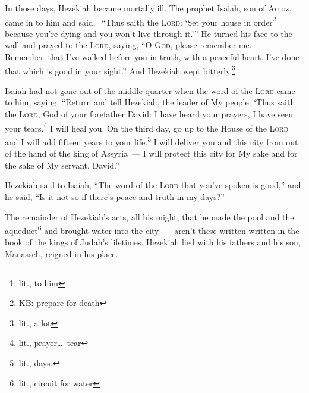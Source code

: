 
\begin{inparaenum}
     In those days, Hezekiah became mortally ill. The prophet Isaiah, son of Amoz, came in to him and said,\footnote{lit., to him} ``Thus saith the \textsc{Lord}: `Set your house in order\footnote{KB: prepare for death} because you're dying and you won't live through it.'\thinspace''%
     He turned his face to the wall and prayed to the \textsc{Lord}, saying,%
     ``O \textsc{God}, please remember me. Remember\understood\ that I've walked before you in truth, with a peaceful heart. I've done that which is good in your sight.'' And Hezekiah wept bitterly.\footnote{lit., a lot}%
    
     Isaiah had not gone out of the middle quarter when the word of the \textsc{Lord} came to him, saying,%
     ``Return and tell Hezekiah, the leader of My people: `Thus saith the \textsc{Lord}, God of your forefather David: I have heard your prayers, I have seen your tears.\footnote{lit., prayer\dots\ tear} I will heal you. On the third day, go up to the House of the \textsc{Lord}%
     and I will add fifteen years to your life.\footnote{lit., days.} I will deliver you and this city from out of the hand of the king of Assyria~--- I will protect this city for My sake and for the sake of My servant, David.''%
    
    
    
     Hezekiah said to Isaiah, ``The word of the \textsc{Lord} that you've spoken is good,'' and he said, ``Is it not so if there's peace and truth in my days?''%
    
     The remainder of Hezekiah's acts, all his might, that he made the pool and the aqueduct\footnote{lit., circuit for water} and brought water into the city~--- aren't these written written in the book of the kings of Judah's lifetimes.%
     Hezekiah lied with his fathers and his son, Manasseh, reigned in his place.%
\end{inparaenum}
